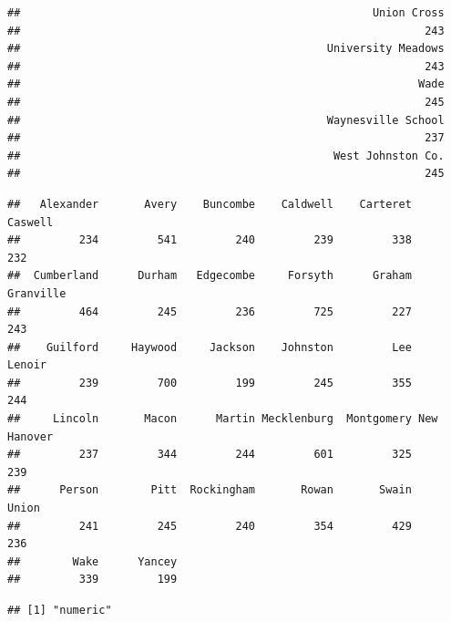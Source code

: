 \documentclass[12pt,]{article}
\newenvironment{Shaded}{\begin{snugshade}}{\end{snugshade}}
\newcommand{\KeywordTok}[1]{\textcolor[rgb]{0.13,0.29,0.53}{\textbf{#1}}}
\newcommand{\FloatTok}[1]{\textcolor[rgb]{0.00,0.00,0.81}{#1}}
\newcommand{\OperatorTok}[1]{\textcolor[rgb]{0.81,0.36,0.00}{\textbf{#1}}}
\newcommand{\NormalTok}[1]{#1}
\begin{document}
\begin{verbatim}
##                                                      Union Cross 
##                                                              243 
##                                               University Meadows 
##                                                              243 
##                                                             Wade 
##                                                              245 
##                                               Waynesville School 
##                                                              237 
##                                                West Johnston Co. 
##                                                              245
\end{verbatim}

\begin{Shaded}
\end{Shaded}

\begin{verbatim}
##   Alexander       Avery    Buncombe    Caldwell    Carteret     Caswell 
##         234         541         240         239         338         232 
##  Cumberland      Durham   Edgecombe     Forsyth      Graham   Granville 
##         464         245         236         725         227         243 
##    Guilford     Haywood     Jackson    Johnston         Lee      Lenoir 
##         239         700         199         245         355         244 
##     Lincoln       Macon      Martin Mecklenburg  Montgomery New Hanover 
##         237         344         244         601         325         239 
##      Person        Pitt  Rockingham       Rowan       Swain       Union 
##         241         245         240         354         429         236 
##        Wake      Yancey 
##         339         199
\end{verbatim}

\begin{Shaded}
\end{Shaded}

\begin{verbatim}
## [1] "numeric"
\end{verbatim}
\end{document}
